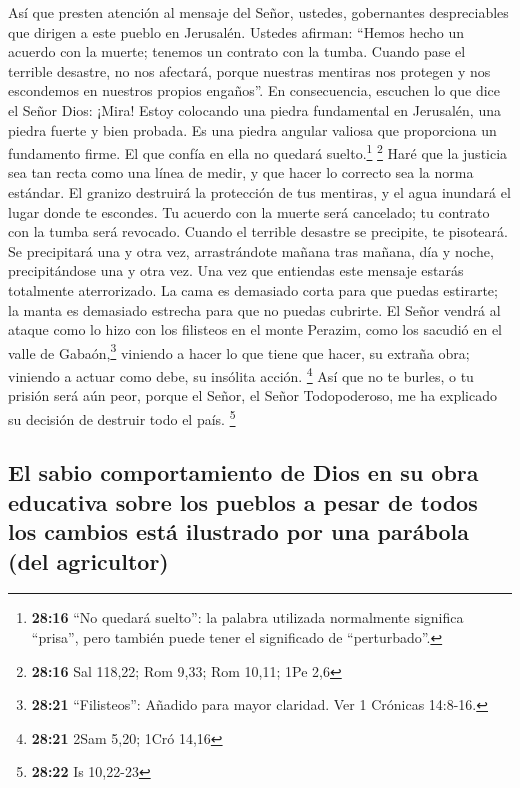  Así que presten atención al mensaje del Señor, ustedes,
gobernantes despreciables que dirigen a este pueblo en Jerusalén.
 Ustedes afirman: ``Hemos hecho un acuerdo con la muerte;
tenemos un contrato con la tumba. Cuando pase el terrible desastre, no
nos afectará, porque nuestras mentiras nos protegen y nos escondemos en
nuestros propios engaños''.  En consecuencia, escuchen lo
que dice el Señor Dios: ¡Mira! Estoy colocando una piedra fundamental en
Jerusalén, una piedra fuerte y bien probada. Es una piedra angular
valiosa que proporciona un fundamento firme. El que confía en ella no
quedará suelto.\footnote{\textbf{28:16} ``No quedará suelto'': la
  palabra utilizada normalmente significa ``prisa'', pero también puede
  tener el significado de ``perturbado''.} \footnote{\textbf{28:16} Sal
  118,22; Rom 9,33; Rom 10,11; 1Pe 2,6}  Haré que la
justicia sea tan recta como una línea de medir, y que hacer lo correcto
sea la norma estándar. El granizo destruirá la protección de tus
mentiras, y el agua inundará el lugar donde te escondes. 
Tu acuerdo con la muerte será cancelado; tu contrato con la tumba será
revocado. Cuando el terrible desastre se precipite, te pisoteará.
 Se precipitará una y otra vez, arrastrándote mañana tras
mañana, día y noche, precipitándose una y otra vez. Una vez que
entiendas este mensaje estarás totalmente aterrorizado. 
La cama es demasiado corta para que puedas estirarte; la manta es
demasiado estrecha para que no puedas cubrirte.  El Señor
vendrá al ataque como lo hizo con los filisteos en el monte Perazim,
como los sacudió en el valle de Gabaón,\footnote{\textbf{28:21}
  ``Filisteos'': Añadido para mayor claridad. Ver 1 Crónicas 14:8-16.}
viniendo a hacer lo que tiene que hacer, su extraña obra; viniendo a
actuar como debe, su insólita acción. \footnote{\textbf{28:21} 2Sam
  5,20; 1Cró 14,16}  Así que no te burles, o tu prisión
será aún peor, porque el Señor, el Señor Todopoderoso, me ha explicado
su decisión de destruir todo el país. \footnote{\textbf{28:22} Is
  10,22-23}

\hypertarget{el-sabio-comportamiento-de-dios-en-su-obra-educativa-sobre-los-pueblos-a-pesar-de-todos-los-cambios-estuxe1-ilustrado-por-una-paruxe1bola-del-agricultor}{%
\subsection{El sabio comportamiento de Dios en su obra educativa sobre
los pueblos a pesar de todos los cambios está ilustrado por una parábola
(del
agricultor)}\label{el-sabio-comportamiento-de-dios-en-su-obra-educativa-sobre-los-pueblos-a-pesar-de-todos-los-cambios-estuxe1-ilustrado-por-una-paruxe1bola-del-agricultor}}

